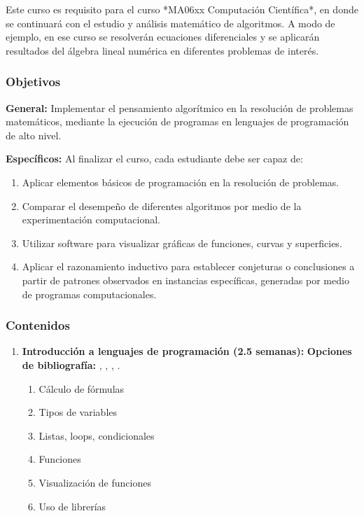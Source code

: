 \begin{refsection}
Este curso es requisito para el curso *MA06xx Computación Científica*, en donde se continuará con el estudio y análisis matemático de algoritmos. A modo de ejemplo, en ese curso se resolverán ecuaciones diferenciales y se aplicarán resultados del álgebra lineal numérica en diferentes problemas de interés.

\subsubsection*{Objetivos}

\textbf{General:} 
Implementar el pensamiento algorítmico en la resolución de problemas matemáticos, mediante la ejecución de programas en lenguajes de programación de alto nivel. 

\textbf{Específicos:}
Al finalizar el curso, cada estudiante debe ser capaz de:
\begin{enumerate}
\item Aplicar elementos básicos de programación en la resolución de problemas. 
\item Comparar el desempeño de diferentes algoritmos por medio de la experimentación computacional.
\item Utilizar software para visualizar gráficas de funciones, curvas y superficies.
\item Aplicar el razonamiento inductivo para establecer conjeturas o conclusiones a partir de patrones observados en instancias específicas, generadas por medio de programas computacionales.
\end{enumerate}

\subsubsection*{Contenidos}

\begin{enumerate}
\item \textbf{Introducción a lenguajes de programación (2.5 semanas):}
\textbf{Opciones de bibliografía:} \cite{Ste16}, \cite{CCC22}, \cite{langtangen_primer_2016}, \cite{BRR15}.

\begin{enumerate} 
    \item Cálculo de fórmulas
    \item Tipos de variables
    \item Listas, loops, condicionales
    \item Funciones
    \item Visualización de funciones
    \item Uso de librerías
\end{enumerate}


\end{enumerate}
\end{refsection}
